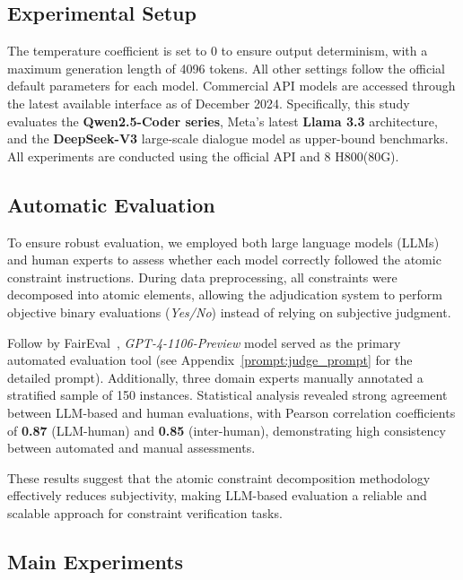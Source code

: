 \subsection{Experimental Setup}
The temperature coefficient is set to 0 to ensure output determinism, with a maximum generation length of 4096 tokens. All other settings follow the official default parameters for each model. Commercial API models are accessed through the latest available interface as of December 2024. Specifically, this study evaluates the \textbf{Qwen2.5-Coder series}, Meta's latest \textbf{Llama 3.3} architecture, and the \textbf{DeepSeek-V3} large-scale dialogue model as upper-bound benchmarks. All experiments are conducted using the official API and 8 H800(80G).

\subsection{Automatic Evaluation}
To ensure robust evaluation, we employed both large language models (LLMs) and human experts to assess whether each model correctly followed the atomic constraint instructions. During data preprocessing, all constraints were decomposed into atomic elements, allowing the adjudication system to perform objective binary evaluations (\textit{Yes/No}) instead of relying on subjective judgment.

Follow by FairEval~\cite{faireval}, \textit{GPT-4-1106-Preview} model served as the primary automated evaluation tool (see Appendix~\ref{prompt:judge_prompt} for the detailed prompt). Additionally, three domain experts manually annotated a stratified sample of 150 instances. Statistical analysis revealed strong agreement between LLM-based and human evaluations, with Pearson correlation coefficients of \textbf{0.87} (LLM-human) and \textbf{0.85} (inter-human), demonstrating high consistency between automated and manual assessments. 

These results suggest that the atomic constraint decomposition methodology effectively reduces subjectivity, making LLM-based evaluation a reliable and scalable approach for constraint verification tasks.



\subsection{Main Experiments}


